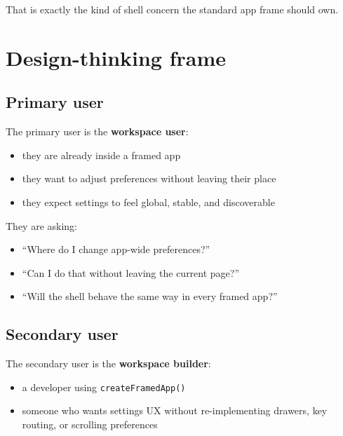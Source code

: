 That is exactly the kind of shell concern the standard app frame should own.

\section{Design-thinking frame}\label{record-057-design-thinking-frame}

\subsection{Primary user}\label{record-057-primary-user}

The primary user is the \textbf{workspace user}:

\begin{itemize}
\tightlist
\item
  they are already inside a framed app
\item
  they want to adjust preferences without leaving their place
\item
  they expect settings to feel global, stable, and discoverable
\end{itemize}

They are asking:

\begin{itemize}
\tightlist
\item
  ``Where do I change app-wide preferences?''
\item
  ``Can I do that without leaving the current page?''
\item
  ``Will the shell behave the same way in every framed app?''
\end{itemize}

\subsection{Secondary user}\label{record-057-secondary-user}

The secondary user is the \textbf{workspace builder}:

\begin{itemize}
\tightlist
\item
  a developer using \texttt{c\allowbreak{}r\allowbreak{}e\allowbreak{}a\allowbreak{}t\allowbreak{}e\allowbreak{}F\allowbreak{}r\allowbreak{}a\allowbreak{}m\allowbreak{}e\allowbreak{}d\allowbreak{}A\allowbreak{}p\allowbreak{}p\allowbreak{}(\allowbreak{})}
\item
  someone who wants settings UX without re-implementing drawers, key routing, or scrolling preferences
\end{itemize}

